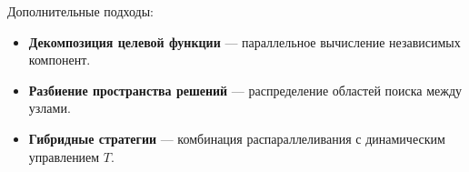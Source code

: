 Дополнительные подходы:
\begin{itemize}
    \item \textbf{Декомпозиция целевой функции} — параллельное вычисление независимых компонент.
    \item \textbf{Разбиение пространства решений} — распределение областей поиска между узлами.
    \item \textbf{Гибридные стратегии} — комбинация распараллеливания с динамическим управлением $T$.
\end{itemize}


